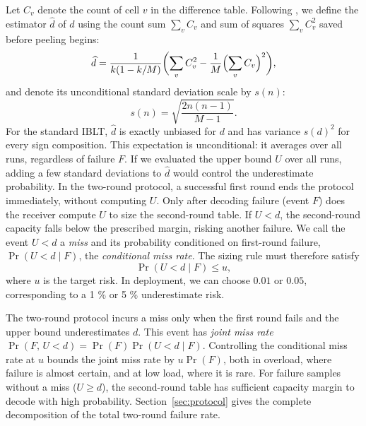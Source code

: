 Let $C_v$ denote the count of cell $v$ in the difference table. Following \cite{wu2026selfsizing}, we define the estimator $\widehat d$ of $d$ using the count sum $\sum_vC_v$ and sum of squares $\sum_vC_v^2$ saved before peeling begins:
\begin{equation}
\widehat d=\frac{1}{k(1-k/M)}\biggl(\sum_vC_v^2-\frac1M\Bigl(\sum_vC_v\Bigr)^2\biggr),\label{eq:dhat}
\end{equation}
and denote its unconditional standard deviation scale by $s(n)$:
\begin{equation}
s(n)=\sqrt{\frac{2n(n-1)}{M-1}}.\label{eq:s}
\end{equation}
For the standard IBLT, $\widehat d$ is exactly unbiased for $d$ and has variance $s(d)^2$ for every sign composition. This expectation is unconditional: it averages over all runs, regardless of failure $F$. If we evaluated the upper bound $U$ over all runs, adding a few standard deviations to $\widehat d$ would control the underestimate probability. In the two-round protocol, a successful first round ends the protocol immediately, without computing $U$. Only after decoding failure (event $F$) does the receiver compute $U$ to size the second-round table. If $U<d$, the second-round capacity falls below the prescribed margin, risking another failure. We call the event $U<d$ a \emph{miss} and its probability conditioned on first-round failure, $\Pr(U<d\mid F)$, the \emph{conditional miss rate}. The sizing rule must therefore satisfy
\begin{equation}
\Pr(U<d\mid F)\le u,\label{eq:target}
\end{equation}
where $u$ is the target risk. In deployment, we can choose $0.01$ or $0.05$, corresponding to a 1 \% or 5 \% underestimate risk.

The two-round protocol incurs a miss only when the first round fails and the upper bound underestimates $d$. This event has \emph{joint miss rate} $\Pr(F,\,U<d)=\Pr(F)\Pr(U<d\mid F)$. Controlling the conditional miss rate at $u$ bounds the joint miss rate by $u\Pr(F)$, both in overload, where failure is almost certain, and at low load, where it is rare. For failure samples without a miss ($U\ge d$), the second-round table has sufficient capacity margin to decode with high probability. Section~\ref{sec:protocol} gives the complete decomposition of the total two-round failure rate.

